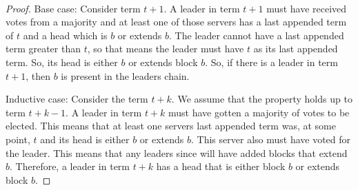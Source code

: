 	\\ \begin{proof} 
            Base case: Consider term $t+1$. 
            A leader in term $t+1$ must have received votes from a majority and at least one of those servers has a last appended term of $t$ and a head which is $b$ or extends $b$. 
            The leader cannot have a last appended term greater than $t$, so that means the leader must have $t$ as its last appended term. 
            So, its head is either $b$ or extends block $b$. 
            So, if there is a leader in term $t+1$, then $b$ is present in the leader\textquotesingle s chain. 
	
                Inductive case: Consider the term $t+k$. 
                We assume that the property holds up to term $t+k-1$. 
                A leader in term $t+k$ must have gotten a majority of votes to be elected. 
                This means that at least one server\textquotesingle s last appended term was, at some point, $t$ and its head is either $b$ or extends $b$. 
                This server also must have voted for the leader. 
                This means that any leaders since will have added blocks that extend $b$. 
                Therefore, a leader in term $t+k$ has a head that is either block $b$ or extends block $b$. 
    \end{proof}